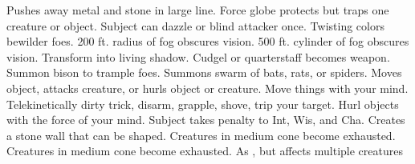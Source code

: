     {Pushes away metal and stone in large line.}
    {Force globe protects but traps one creature or object.}
    {Subject can dazzle or blind attacker once.}
    {Twisting colors bewilder foes.}
    {200 ft. radius of fog obscures vision.}
    {500 ft. cylinder of fog obscures vision.}
    {Transform into living shadow.}
    {Cudgel or quarterstaff becomes  weapon.}
    {Summon bison to trample foes.}
    {Summons swarm of bats, rats, or spiders.}
    {Moves object, attacks creature, or hurls object or creature.}
    {Move things with your mind.}
    {Telekinetically dirty trick, disarm, grapple, shove, trip your target.}
    {Hurl objects with the force of your mind.}
    {Subject takes  penalty to Int, Wis, and Cha.}
    {Creates a stone wall that can be shaped.}
    {Creatures in medium cone become exhausted.}
    {Creatures in medium cone become exhausted.}
    {As , but affects multiple creatures}
